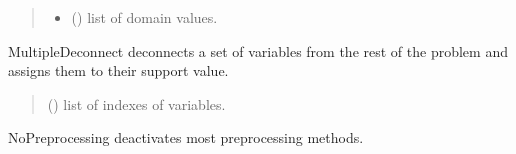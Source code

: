 \documentclass[letterpaper,10pt,openany,oneside,english]{sphinxmanual}
\begin{document}
\begin{fulllineitems}
\begin{fulllineitems}
\begin{quote}
\begin{description}
\begin{itemize}
\item {} 
\sphinxAtStartPar
{} () \textendash{} list of domain values.

\end{itemize}

\end{description}\end{quote}

\end{fulllineitems}


\begin{fulllineitems}
\label{\detokenize{ref/ref_python:pytoulbar2.CFN.MultipleDeconnect}}
\pysigstartsignatures
{}
\pysigstopsignatures
\sphinxAtStartPar
MultipleDeconnect deconnects a set of variables from the rest of the problem and assigns them to their support value.
\begin{quote}\begin{description}
\sphinxAtStartPar
{} () \textendash{} list of indexes of variables.

\end{description}\end{quote}

\end{fulllineitems}


\begin{fulllineitems}
\label{\detokenize{ref/ref_python:pytoulbar2.CFN.NoPreprocessing}}
\pysigstartsignatures
{}
\pysigstopsignatures
\sphinxAtStartPar
NoPreprocessing deactivates most preprocessing methods.

\end{fulllineitems}



\end{fulllineitems}
\end{document}
